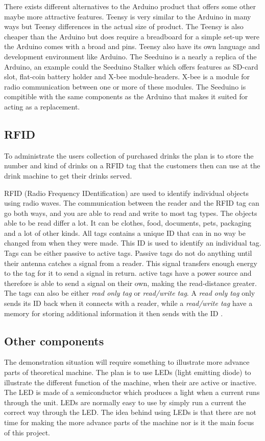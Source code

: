There exists different alternatives to the Arduino product that offers some other maybe more attractive features. Teensy is very similar to the Arduino in many ways but Teensy differences in the actual size of product. The Teensy is also cheaper than the Arduino but does require a breadboard for a simple set-up were the Arduino comes with a broad and pins. Teensy also have its own language and development environment like Arduino.
The Seeduino is a nearly a replica of the Arduino, an example could the Seeduino Stalker which offers features as SD-card slot, flat-coin battery holder and X-bee module-headers. X-bee is a module for radio communication between one or more of these modules. The Seeduino is compitible with the same components as the Arduino that makes it suited for acting as a replacement.
\subsection{RFID}
To administrate the users collection of purchased drinks the plan is to store the number and kind of drinks on a RFID tag that the customers then can use at the drink machine to get their drinks served.

RFID (Radio Frequency IDentification) are used to identify individual objects using radio waves.
The communication between the reader and the RFID tag can go both ways, and you are able to read and write to most tag types. 
The objects able to be read differ a lot. It can be clothes, food, documents, pets, packaging and a lot of other kinds. 
All tags contains a unique ID that can in no way be changed from when they were made. This ID is used to identify an individual tag.
Tags can be either passive to active tags. Passive tags do not do anything until their antenna catches a signal from a reader. This signal transfers enough energy to the tag for it to send a signal in return. active tags have a power source and therefore is able to send a signal on their own, making the read-distance greater.
The tags can also be either \textit{read only tag} or \textit{read/write tag}. A \textit{read only tag} only sends its ID back when it connects with a reader, while a \textit{read/write tag} have a memory for storing additional information it then sends with the ID \citep{RFID}.

\subsection{Other components}
The demonstration situation will require something to illustrate more advance parts of theoretical machine. The plan is to use LEDs (light emitting diode) to illustrate the different function of the machine, when their are active or inactive. The LED is made of a semiconductor which produces a light when a current runs through the unit. LEDs are normally easy to use by simply run a current the correct way through the LED.
The idea behind using LEDs is that there are not time for making the more advance parts of the machine nor is it the main focus of this project.

